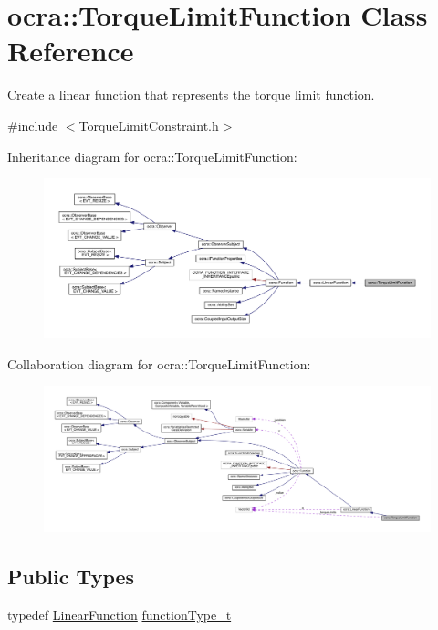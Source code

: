 \hypertarget{classocra_1_1TorqueLimitFunction}{}\section{ocra\+:\+:Torque\+Limit\+Function Class Reference}
\label{classocra_1_1TorqueLimitFunction}


Create a linear function that represents the torque limit function.  




{\ttfamily \#include $<$Torque\+Limit\+Constraint.\+h$>$}



Inheritance diagram for ocra\+:\+:Torque\+Limit\+Function\+:\nopagebreak
\begin{figure}[H]
\begin{center}
\leavevmode
\includegraphics[width=350pt]{db/d0c/classocra_1_1TorqueLimitFunction__inherit__graph}
\end{center}
\end{figure}


Collaboration diagram for ocra\+:\+:Torque\+Limit\+Function\+:\nopagebreak
\begin{figure}[H]
\begin{center}
\leavevmode
\includegraphics[width=350pt]{df/df1/classocra_1_1TorqueLimitFunction__coll__graph}
\end{center}
\end{figure}
\subsection*{Public Types}
\begin{DoxyCompactItemize}
\item 
typedef \hyperlink{classocra_1_1LinearFunction}{Linear\+Function} \hyperlink{classocra_1_1TorqueLimitFunction_a0c9d97d4e11ee173ae359698d6c95b25}{function\+Type\+\_\+t}
\end{DoxyCompactItemize}
